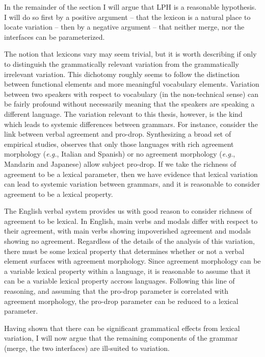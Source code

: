\documentclass[MilwayThesis]{subfiles}
\begin{document}
In the remainder of the section I will argue that LPH is a reasonable hypothesis.
I will do so first by a positive argument -- that the lexicon is a natural place to locate variation -- then by a negative argument -- that neither merge, nor the interfaces can be parameterized.

The notion that lexicons vary may seem trivial, but it is worth describing if only to distinguish the grammatically relevant variation from the grammatically irrelevant variation.
This dichotomy roughly seems to follow the distinction between functional elements and more meaningful vocabulary elements.
Variation between two speakers with respect to vocabulary (in the non-technical sense) can be fairly profound without necessarily meaning that the speakers are speaking a different language.
The variation relevant to this thesis, however, is the kind which leads to systemic differences between grammars.
For instance, consider the link between verbal agreement and pro-drop.
Synthesizing a broad set of empirical studies, \textcite{huang1984distribution} observes that only those languages with rich agreement morphology (\textit{e.g.}, Italian and Spanish) or no agreement morphology (\textit{e.g.}, Mandarin and Japanese) allow subject pro-drop.
If we take the richness of agreement to be a lexical parameter, then we have evidence that lexical variation can lead to systemic variation between grammars, and it is reasonable to consider agreement to be a lexical property.

The English verbal system provides us with good reason to consider richness of agreement to be lexical.
In English, main verbs and modals differ with respect to their agreement, with main verbs showing impoverished agreement and modals showing no agreement.
Regardless of the details of the analysis of this variation, there must be some lexical property that determines whether or not a verbal element surfaces with agreement morphology.
Since agreement morphology can be a variable lexical property within a language, it is reasonable to assume that it can be a variable lexical property accross languages.
Following this line of reasoning, and assuming that the pro-drop parameter is correlated with agreement morphology, the pro-drop parameter can be reduced to a lexical parameter.

Having shown that there can be significant grammatical effects from lexical variation, I will now argue that the remaining components of the grammar (merge, the two interfaces) are ill-suited to variation.
\end{document}
